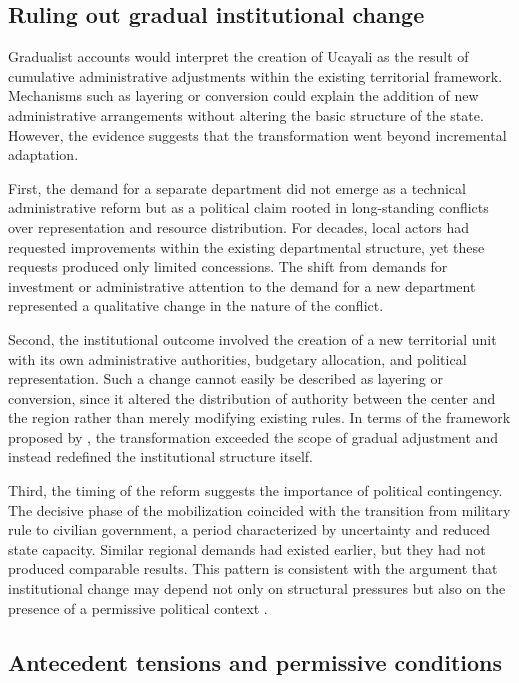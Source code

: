 \documentclass[12pt]{article}
\begin{document}
\subsection*{Ruling out gradual institutional change}

Gradualist accounts would interpret the creation of Ucayali as the
result of cumulative administrative adjustments within the existing
territorial framework. Mechanisms such as layering or conversion could
explain the addition of new administrative arrangements without altering
the basic structure of the state. However, the evidence suggests that
the transformation went beyond incremental adaptation.

First, the demand for a separate department did not emerge as a technical
administrative reform but as a political claim rooted in long-standing
conflicts over representation and resource distribution. For decades,
local actors had requested improvements within the existing departmental
structure, yet these requests produced only limited concessions. The
shift from demands for investment or administrative attention to the
demand for a new department represented a qualitative change in the
nature of the conflict.

Second, the institutional outcome involved the creation of a new
territorial unit with its own administrative authorities, budgetary
allocation, and political representation. Such a change cannot easily
be described as layering or conversion, since it altered the distribution
of authority between the center and the region rather than merely
modifying existing rules. In terms of the framework proposed by
\textcite{streeck_introduction_2005}, the transformation exceeded the scope
of gradual adjustment and instead redefined the institutional structure
itself.

Third, the timing of the reform suggests the importance of political
contingency. The decisive phase of the mobilization coincided with the
transition from military rule to civilian government, a period
characterized by uncertainty and reduced state capacity. Similar regional
demands had existed earlier, but they had not produced comparable results.
This pattern is consistent with the argument that institutional change
may depend not only on structural pressures but also on the presence of
a permissive political context \autocite{collier_shaping_1991}.

\subsection*{Antecedent tensions and permissive conditions}
\end{document}
